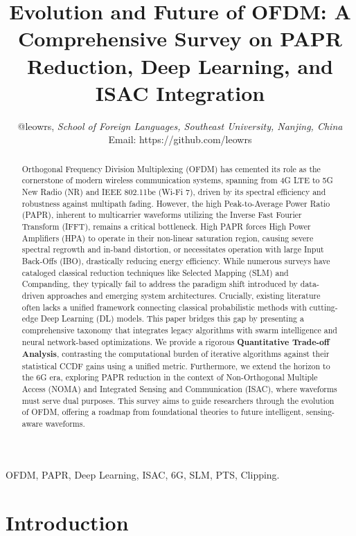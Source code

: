 \documentclass[journal]{IEEEtran}
\title{Evolution and Future of OFDM: A Comprehensive Survey on PAPR Reduction, Deep Learning, and ISAC Integration}
\author{@leowrs, \textit{School of Foreign Languages, Southeast University, Nanjing, China}\\
Email: https://github.com/leowrs}
\begin{document}
\maketitle

\begin{abstract}
    Orthogonal Frequency Division Multiplexing (OFDM) has cemented its role as the cornerstone of modern wireless communication systems, spanning from 4G LTE to 5G New Radio (NR) and IEEE 802.11be (Wi-Fi 7), driven by its spectral efficiency and robustness against multipath fading. However, the high Peak-to-Average Power Ratio (PAPR), inherent to multicarrier waveforms utilizing the Inverse Fast Fourier Transform (IFFT), remains a critical bottleneck. High PAPR forces High Power Amplifiers (HPA) to operate in their non-linear saturation region, causing severe spectral regrowth and in-band distortion, or necessitates operation with large Input Back-Offs (IBO), drastically reducing energy efficiency. While numerous surveys have cataloged classical reduction techniques like Selected Mapping (SLM) and Companding, they typically fail to address the paradigm shift introduced by data-driven approaches and emerging system architectures. Crucially, existing literature often lacks a unified framework connecting classical probabilistic methods with cutting-edge Deep Learning (DL) models. This paper bridges this gap by presenting a comprehensive taxonomy that integrates legacy algorithms with swarm intelligence and neural network-based optimizations. We provide a rigorous \textbf{Quantitative Trade-off Analysis}, contrasting the computational burden of iterative algorithms against their statistical CCDF gains using a unified metric. Furthermore, we extend the horizon to the 6G era, exploring PAPR reduction in the context of Non-Orthogonal Multiple Access (NOMA) and Integrated Sensing and Communication (ISAC), where waveforms must serve dual purposes. This survey aims to guide researchers through the evolution of OFDM, offering a roadmap from foundational theories to future intelligent, sensing-aware waveforms.
\end{abstract}

\begin{IEEEkeywords}
    OFDM, PAPR, Deep Learning, ISAC, 6G, SLM, PTS, Clipping.
\end{IEEEkeywords}

\section{Introduction}
\end{document}
